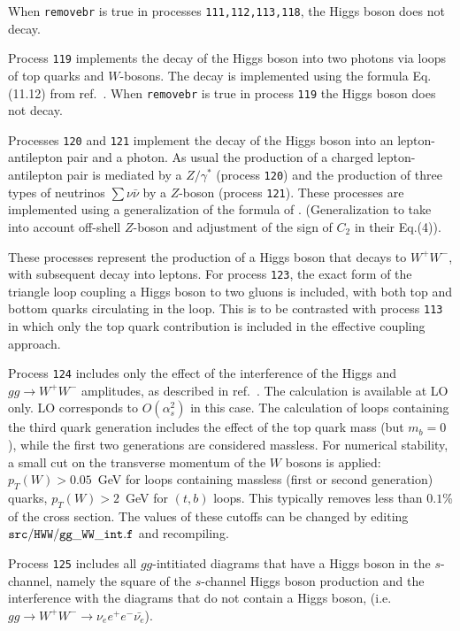 When {\tt removebr} is true in processes {\tt 111,112,113,118},
the Higgs boson does not decay.

Process {\tt 119} implements the decay of the Higgs boson into two photons
via loops of top quarks and $W$-bosons.
The decay is implemented using the formula Eq.(11.12) from ref.~\cite{Ellis:1991qj}.
When {\tt removebr} is true in process {\tt 119} the Higgs boson does not decay.

Processes {\tt 120} and {\tt 121} implement the decay of the Higgs boson into an lepton-antilepton
pair and a photon. As usual the production of a charged lepton-antilepton pair is mediated by a 
$Z/\gamma^*$ (process {\tt 120}) and the production of three types of neutrinos 
$\sum  \nu \bar{\nu}$ by a $Z$-boson (process {\tt 121}). These processes are implemented 
using a generalization of the formula of \cite{Djouadi:1996yq}. (Generalization to take into
account off-shell $Z$-boson and adjustment of the sign of $C_2$ in their Eq.(4)).


These processes represent the production of a Higgs boson that decays to $W^+ W^-$,
with subsequent decay into leptons. For process {\tt 123}, the exact form of the triangle
loop coupling a Higgs boson to two gluons is included, with both top and bottom quarks
circulating in the loop. This is to be contrasted with process {\tt 113} in which only the
top quark contribution is included in the effective coupling approach.

Process {\tt 124} includes only the effect of the interference of the
Higgs and $gg \to W^+W^-$ amplitudes, as described in ref.~\cite{Campbell:2011cu}.
The calculation is available at LO only. LO corresponds to $O(\alpha_s^2)$ in this case.
The calculation of loops containing the third quark generation
includes the effect of the top quark mass (but $m_b=0$), while the first two
generations are considered massless. For numerical stability, a small cut on the
transverse momentum of the $W$ bosons is applied: $p_T(W)>0.05$~GeV for loops
containing massless (first or second generation) quarks, $p_T(W)>2$~GeV for $(t,b)$
loops. This typically removes less than $0.1$\% of the cross section. The
values of these cutoffs can be changed by editing ${\tt src/HWW/gg\_WW\_int.f}$ and recompiling.

Process {\tt 125} includes all $gg$-intitiated diagrams that have a Higgs boson in the $s$-channel,
namely the square of the $s$-channel Higgs boson production and the interference with the diagrams
that do not contain a Higgs boson, (i.e. $gg \to W^+W^- \to \nu_e e^+ e^- \bar{\nu_e}$).

